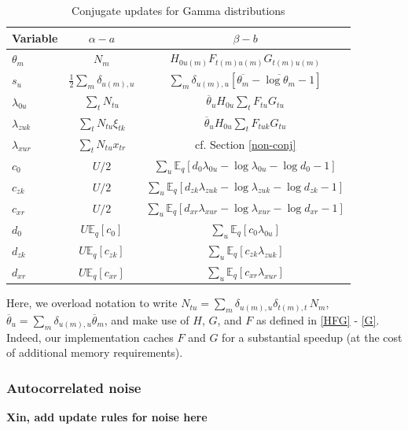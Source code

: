 \documentclass[10pt,letterpaper]{article}
\begin{document}
\begin{table}[ht]
\caption{Conjugate updates for Gamma distributions}
\label{conj_updates}
\begin{center}
\begin{tabular}{lcc}
\multicolumn{1}{c}{\bf Variable}  &\multicolumn{1}{c}{\bf $\alpha - a$} &\multicolumn{1}{c}{\bf $\beta - b$}
\\ \hline
$\theta_m$         &$N_m$  &$H_{0u(m)}F_{t(m)u(m)}G_{t(m)u(m)}$ \\
$s_u$         &$\frac{1}{2}\sum_m \delta_{u(m), u}$  &$\sum_m \delta_{u(m), u} [\overline{\theta_m} - \overline{\log \theta_m} - 1]$ \\
$\lambda_{0u}$         &$\sum_{t} N_{tu}$  &$\overline{\theta}_u H_{0u}\sum_t F_{tu}G_{tu}$ \\
$\lambda_{zuk}$         &$\sum_t N_{tu} \xi_{tk}$  &$\overline{\theta}_u H_{0u}\sum_t F_{tuk}G_{tu}$ \\
$\lambda_{xur}$         &$\sum_t N_{tu} x_{tr}$  &cf. Section \ref{non-conj} \\
$c_{0}$         &$U/2$  &$\sum_u\mathbb{E}_q \left[d_{0} \lambda_{0u} - \log \lambda_{0u} - \log d_{0} - 1\right]$ \\
$c_{zk}$         &$U/2$  &$\sum_u\mathbb{E}_q \left[d_{zk} \lambda_{zuk} - \log \lambda_{zuk} - \log d_{zk} - 1\right]$ \\
$c_{xr}$         &$U/2$  &$\sum_u\mathbb{E}_q \left[d_{xr} \lambda_{xur} - \log \lambda_{xur} - \log d_{xr} - 1\right]$ \\
$d_{0}$         &$U\mathbb{E}_q[c_{0}]$  &$\sum_u\mathbb{E}_q \left[c_{0}\lambda_{0u}\right]$ \\
$d_{zk}$         &$U\mathbb{E}_q[c_{zk}]$  &$\sum_u\mathbb{E}_q \left[c_{zk}\lambda_{zuk}\right]$ \\
$d_{xr}$         &$U\mathbb{E}_q[c_{xr}]$  &$\sum_u\mathbb{E}_q \left[c_{xr}\lambda_{xur}\right]$ \\
\end{tabular}
\end{center}
\end{table}

Here, we overload notation to write $N_{tu} = \sum_m \delta_{u(m), u} \delta_{t(m), t}\, N_m$, $\overline{\theta}_u = \sum_m \delta_{u(m), u}\overline{\theta}_m$, and make use of $H$, $G$, and $F$ as defined in \ref{HFG} - \ref{G}. Indeed, our implementation caches $F$ and $G$ for a substantial speedup (at the cost of additional memory requirements).

\subsubsection{Autocorrelated noise}
{\bf Xin, add update rules for noise here}
\end{document}
